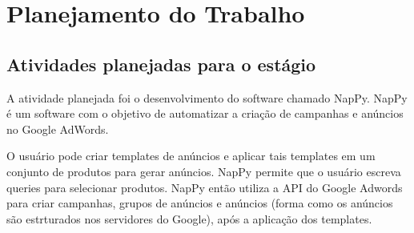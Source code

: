 \chapter{Planejamento do Trabalho}
\label{chap:atividadesPlanejadas}


\section{Atividades planejadas para o estágio}

A atividade planejada foi o desenvolvimento do software chamado
NapPy. NapPy é um software com o objetivo de automatizar a
criação de campanhas e anúncios no Google AdWords.

O usuário pode criar templates de anúncios e aplicar tais
templates em um conjunto de produtos para gerar anúncios. NapPy
permite que o usuário escreva queries para selecionar produtos.
NapPy então utiliza a API do Google Adwords para criar campanhas,
grupos de anúncios e anúncios (forma como os anúncios são
estrturados nos servidores do Google), após a aplicação dos templates.








